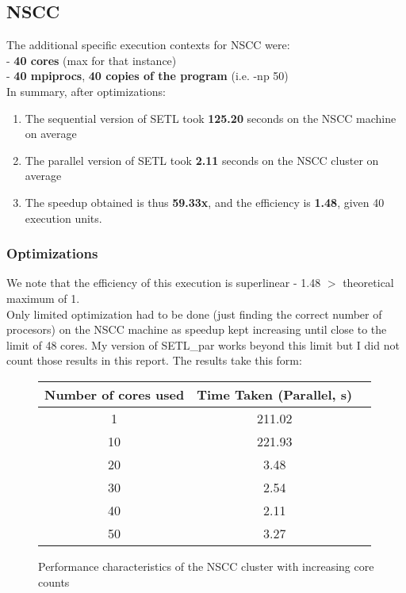 \documentclass[12pt,a4paper]{article}
\begin{document}
\subsection{NSCC}
The additional specific execution contexts for NSCC were: \\

- \textbf{40 cores} (max for that instance) \\
- \textbf{40 mpiprocs}, \textbf{40 copies of the program} (i.e. -np 50)\\

In summary, after optimizations: 
\begin{enumerate} 
\item{The sequential version of SETL took \textbf{125.20} seconds on the NSCC machine on average}
\item{The parallel version of SETL took \textbf{2.11} seconds on the NSCC cluster on average}
\item{The speedup obtained is thus \textbf{59.33x}, and the efficiency is \textbf{1.48}, given 40 execution units.}
\end{enumerate}

\subsubsection{Optimizations}

We note that the efficiency of this execution is superlinear - 1.48 $>$ theoretical maximum of 1. \\

Only limited optimization had to be done (just finding the correct number of procesors) on the NSCC machine as speedup kept increasing until close to the limit of 48 cores. My version of SETL\_par works beyond this limit but I did not count those results in this report. The results take this form: 

\begin{figure}[h]
\begin{center}
\begin{tabular}{ |c|c|c| } 
\hline
Number of cores used & Time Taken (Parallel, s) \\
\hline
1 & 211.02 \\
10 & 221.93\\
20 & 3.48 \\
30 & 2.54 \\
40 & 2.11  \\
50 & 3.27\\
\hline
\end{tabular}
\end{center}
\caption{Performance characteristics of the NSCC cluster with increasing core counts}
\end{figure}
\end{document}
